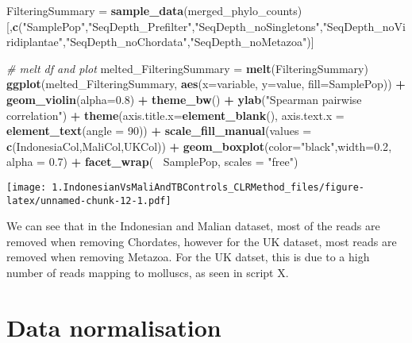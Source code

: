 \documentclass[]{article}
\newenvironment{Shaded}{\begin{snugshade}}{\end{snugshade}}
\newcommand{\CommentTok}[1]{\textcolor[rgb]{0.56,0.35,0.01}{\textit{#1}}}
\newcommand{\DataTypeTok}[1]{\textcolor[rgb]{0.13,0.29,0.53}{#1}}
\newcommand{\DecValTok}[1]{\textcolor[rgb]{0.00,0.00,0.81}{#1}}
\newcommand{\FloatTok}[1]{\textcolor[rgb]{0.00,0.00,0.81}{#1}}
\newcommand{\KeywordTok}[1]{\textcolor[rgb]{0.13,0.29,0.53}{\textbf{#1}}}
\newcommand{\NormalTok}[1]{#1}
\newcommand{\OperatorTok}[1]{\textcolor[rgb]{0.81,0.36,0.00}{\textbf{#1}}}
\newcommand{\StringTok}[1]{\textcolor[rgb]{0.31,0.60,0.02}{#1}}
\begin{document}
\begin{Shaded}
\begin{Highlighting}[]
\NormalTok{FilteringSummary =}\StringTok{ }\KeywordTok{sample_data}\NormalTok{(merged_phylo_counts)[,}\KeywordTok{c}\NormalTok{(}\StringTok{"SamplePop"}\NormalTok{,}\StringTok{"SeqDepth_Prefilter"}\NormalTok{,}\StringTok{"SeqDepth_noSingletons"}\NormalTok{,}\StringTok{"SeqDepth_noViridiplantae"}\NormalTok{,}\StringTok{"SeqDepth_noChordata"}\NormalTok{,}\StringTok{"SeqDepth_noMetazoa"}\NormalTok{)]}

\CommentTok{# melt df and plot}
\NormalTok{melted_FilteringSummary =}\StringTok{ }\KeywordTok{melt}\NormalTok{(FilteringSummary)}
\KeywordTok{ggplot}\NormalTok{(melted_FilteringSummary, }\KeywordTok{aes}\NormalTok{(}\DataTypeTok{x=}\NormalTok{variable, }\DataTypeTok{y=}\NormalTok{value, }\DataTypeTok{fill=}\NormalTok{SamplePop)) }\OperatorTok{+}
\StringTok{  }\KeywordTok{geom_violin}\NormalTok{(}\DataTypeTok{alpha=}\FloatTok{0.8}\NormalTok{) }\OperatorTok{+}\StringTok{ }\KeywordTok{theme_bw}\NormalTok{() }\OperatorTok{+}\StringTok{ }\KeywordTok{ylab}\NormalTok{(}\StringTok{"Spearman pairwise correlation"}\NormalTok{) }\OperatorTok{+}
\StringTok{  }\KeywordTok{theme}\NormalTok{(}\DataTypeTok{axis.title.x=}\KeywordTok{element_blank}\NormalTok{(), }\DataTypeTok{axis.text.x =} \KeywordTok{element_text}\NormalTok{(}\DataTypeTok{angle =} \DecValTok{90}\NormalTok{)) }\OperatorTok{+}\StringTok{ }\KeywordTok{scale_fill_manual}\NormalTok{(}\DataTypeTok{values =} \KeywordTok{c}\NormalTok{(IndonesiaCol,MaliCol,UKCol)) }\OperatorTok{+}
\StringTok{  }\KeywordTok{geom_boxplot}\NormalTok{(}\DataTypeTok{color=}\StringTok{"black"}\NormalTok{,}\DataTypeTok{width=}\FloatTok{0.2}\NormalTok{, }\DataTypeTok{alpha =} \FloatTok{0.7}\NormalTok{) }\OperatorTok{+}\StringTok{ }\KeywordTok{facet_wrap}\NormalTok{(}\OperatorTok{~}\StringTok{ }\NormalTok{SamplePop, }\DataTypeTok{scales =} \StringTok{"free"}\NormalTok{)}
\end{Highlighting}
\end{Shaded}

\texttt{[image: 1.IndonesianVsMaliAndTBControls\_CLRMethod\_files/figure-latex/unnamed-chunk-12-1.pdf]}

We can see that in the Indonesian and Malian dataset, most of the reads
are removed when removing Chordates, however for the UK dataset, most
reads are removed when removing Metazoa. For the UK datset, this is due
to a high number of reads mapping to molluscs, as seen in script X.

\hypertarget{data-normalisation}{%
\section{Data normalisation}\label{data-normalisation}}
\end{document}
